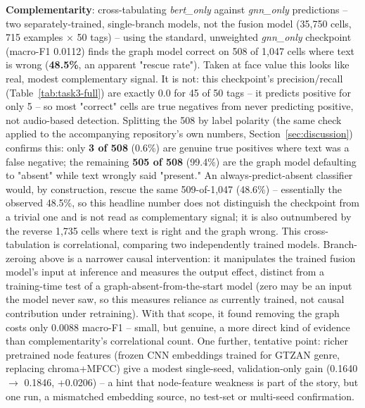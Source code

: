 \textbf{Complementarity}: cross-tabulating \textit{bert\_only} against \textit{gnn\_only}
predictions -- two separately-trained, single-branch models, not the fusion model
(35{,}750 cells, 715 examples $\times$ 50 tags) -- using the standard, unweighted
\textit{gnn\_only} checkpoint (macro-F1 0.0112) finds the graph model correct on 508 of
1{,}047 cells where text is wrong (\textbf{48.5\%}, an apparent "rescue rate"). Taken at face
value this looks like real, modest complementary signal. It is not: this checkpoint's
precision/recall (Table~\ref{tab:task3-full}) are exactly 0.0 for 45 of 50 tags -- it
predicts positive for only 5 -- so most "correct" cells are true negatives from never
predicting positive, not audio-based detection. Splitting the 508 by label polarity (the same
check applied to the accompanying repository's own numbers, Section~\ref{sec:discussion})
confirms this: only \textbf{3 of 508} (0.6\%) are genuine true positives where text was a
false negative; the remaining \textbf{505 of 508} (99.4\%) are the graph model defaulting to
"absent" while text wrongly said "present." An always-predict-absent classifier would, by
construction, rescue the same 509-of-1{,}047 (48.6\%) -- essentially the observed 48.5\%, so
this headline number does not distinguish the checkpoint from a trivial one and is not read
as complementary signal; it is also outnumbered by the reverse 1{,}735 cells where text is
right and the graph wrong. This cross-tabulation is correlational, comparing two
independently trained models. Branch-zeroing above is a narrower causal intervention: it
manipulates the trained fusion model's input at inference and measures the output effect,
distinct from a training-time test of a graph-absent-from-the-start model (zero may be an
input the model never saw, so this measures reliance as currently trained, not causal
contribution under retraining). With that scope, it found removing the graph costs only
0.0088 macro-F1 -- small, but genuine, a more direct kind of evidence than complementarity's
correlational count. One further, tentative point: richer pretrained node features (frozen
CNN embeddings trained for GTZAN genre, replacing chroma+MFCC) give a modest single-seed,
validation-only gain (0.1640 $\to$ 0.1846, +0.0206) -- a hint that node-feature weakness is
part of the story, but one run, a mismatched embedding source, no test-set or multi-seed
confirmation.

